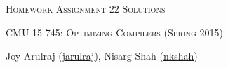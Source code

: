 \documentclass[letterpaper]{article}
\makeatletter
\def \issoln {1}
\newcommand{\email}[1]{\href{mailto:#1@cs.cmu.edu}{#1}}
\makeatother
\begin{document}
\section*{}
\begin{center}
  \centerline{\textsc{\LARGE Homework Assignment 2{\if\issoln 2 Solutions \else \fi}}}
  \vspace{1em}
  \textsc{\large CMU 15-745: Optimizing Compilers (Spring 2015)} \\
  \vspace{3em}
  \centerline{\large{Joy Arulraj (\email{jarulraj}), Nisarg Shah (\email{nkshah})}}
  \vspace{1em}
\end{center}

%



\end{document}
